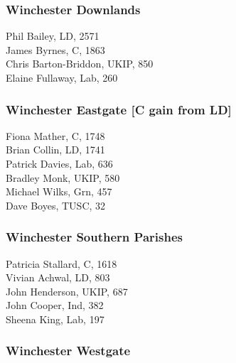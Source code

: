 \documentclass[a4paper,openany,10pt]{book}
\begin{document}
\subsubsection*{Winchester Downlands}



Phil Bailey, LD, 2571\\
James Byrnes, C, 1863\\
Chris Barton-Briddon, UKIP, 850\\
Elaine Fullaway, Lab, 260\\


\subsubsection*{Winchester Eastgate \hspace*{\fill}\nolinebreak[1]%
\enspace\hspace*{\fill}
[C gain from LD]}



Fiona Mather, C, 1748\\
Brian Collin, LD, 1741\\
Patrick Davies, Lab, 636\\
Bradley Monk, UKIP, 580\\
Michael Wilks, Grn, 457\\
Dave Boyes, TUSC, 32\\


\subsubsection*{{Winchester Southern Parishes}}



Patricia Stallard, C, 1618\\
Vivian Achwal, LD, 803\\
John Henderson, UKIP, 687\\
John Cooper, Ind, 382\\
Sheena King, Lab, 197\\


\subsubsection*{Winchester Westgate}
\end{document}
